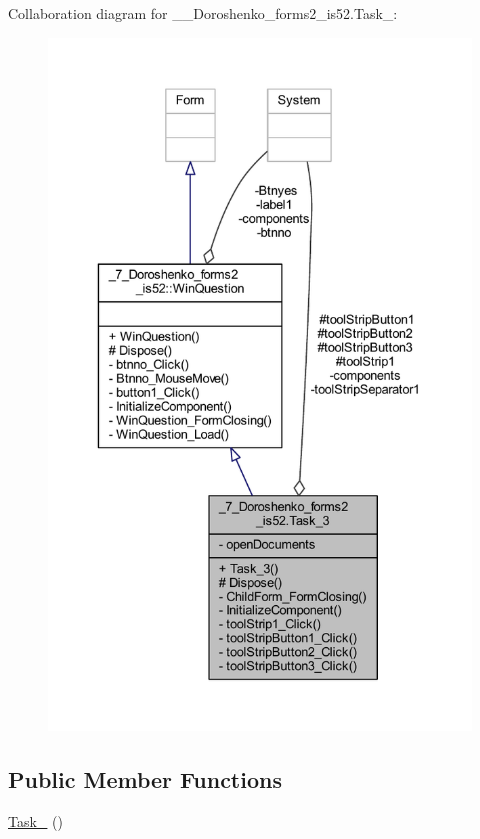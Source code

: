 Collaboration diagram for \+\_\+\_\+\+Doroshenko\+\_\+forms2\+\_\+is52.\+Task\+\_\+:
\nopagebreak
\begin{figure}[H]
\begin{center}
\leavevmode
\includegraphics[width=335pt]{class__7___doroshenko__forms2__is52_1_1_task__3__coll__graph}
\end{center}
\end{figure}
\subsection*{Public Member Functions}
\begin{DoxyCompactItemize}
\item 
\hyperlink{class__7___doroshenko__forms2__is52_1_1_task__3_a2f9a46fcf9e46005111d857b5ac6ab6b}{Task\+\_} ()
\end{DoxyCompactItemize}
